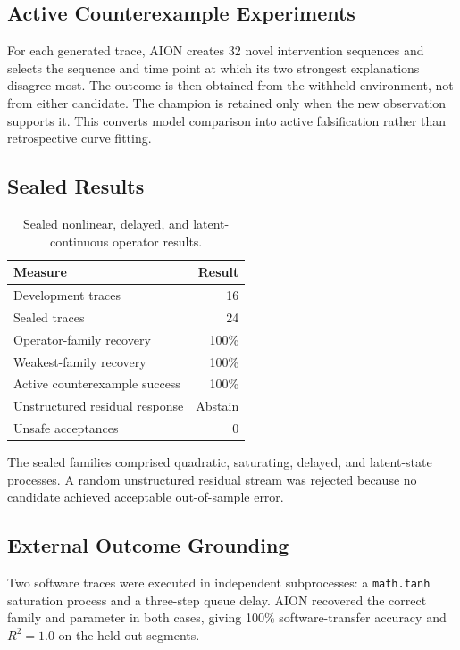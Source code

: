 \subsection{Active Counterexample Experiments}

For each generated trace, AION creates 32 novel intervention sequences and
selects the sequence and time point at which its two strongest explanations
disagree most. The outcome is then obtained from the withheld environment, not
from either candidate. The champion is retained only when the new observation
supports it. This converts model comparison into active falsification rather
than retrospective curve fitting.

\subsection{Sealed Results}

\begin{table}[htbp]
\centering
\begin{tabular}{lr}
\hline
\textbf{Measure} & \textbf{Result}\\
\hline
Development traces & 16\\
Sealed traces & 24\\
Operator-family recovery & 100\%\\
Weakest-family recovery & 100\%\\
Active counterexample success & 100\%\\
Unstructured residual response & Abstain\\
Unsafe acceptances & 0\\
\hline
\end{tabular}
\caption{Sealed nonlinear, delayed, and latent-continuous operator results.}
\end{table}

The sealed families comprised quadratic, saturating, delayed, and latent-state
processes. A random unstructured residual stream was rejected because no
candidate achieved acceptable out-of-sample error.

\subsection{External Outcome Grounding}

Two software traces were executed in independent subprocesses: a
\texttt{math.tanh} saturation process and a three-step queue delay. AION
recovered the correct family and parameter in both cases, giving 100\%
software-transfer accuracy and \(R^2=1.0\) on the held-out segments.

